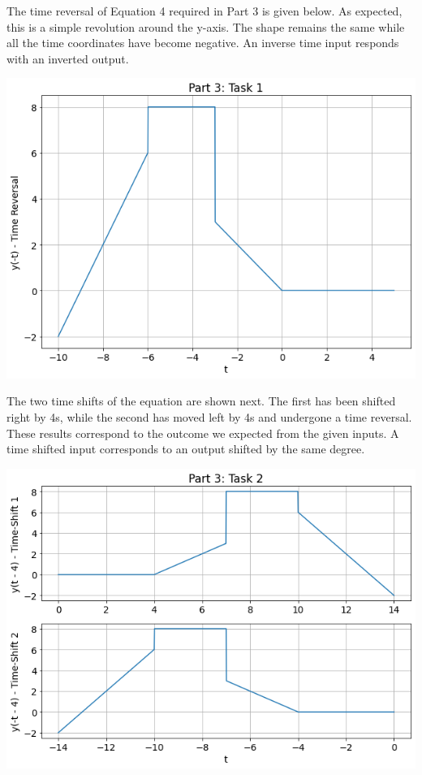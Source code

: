 \documentclass[12pt]{report}
\begin{document}
The time reversal of Equation 4 required in Part 3 is given below. As expected, this is a simple revolution around the y-axis. The shape remains the same while all the time coordinates have become negative. An inverse time input responds with an inverted output. \\

\begin{center}
    \includegraphics[scale = 0.42]{Lab 2 - Plots/Part3-Task1.png}\\[1.0 cm]
\end{center}

The two time shifts of the equation are shown next. The first has been shifted right by 4s, while the second has moved left by 4s and undergone a time reversal. These results correspond to the outcome we expected from the given inputs. A time shifted input corresponds to an output shifted by the same degree. \\

\begin{center}
    \includegraphics[scale = 0.46]{Lab 2 - Plots/Part3-Task2.png}\\[1.0 cm]
\end{center}
\end{document}
